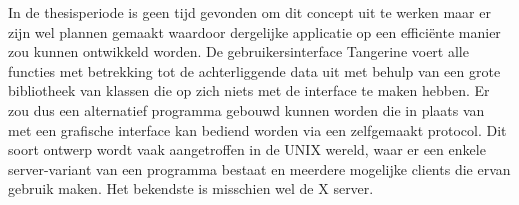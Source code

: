 In de thesisperiode is geen tijd gevonden om dit concept uit te werken maar er zijn wel plannen gemaakt waardoor dergelijke
applicatie op een effici\"ente manier zou kunnen ontwikkeld worden. De gebruikersinterface Tangerine voert alle functies met betrekking tot de achterliggende data uit met behulp van een grote bibliotheek
van klassen die op zich niets met de interface te maken hebben. Er zou dus een alternatief programma gebouwd kunnen worden die in plaats van met een grafische interface kan bediend worden
via een zelfgemaakt protocol. Dit soort ontwerp wordt vaak aangetroffen in de UNIX wereld, waar er een enkele server-variant van een programma bestaat en meerdere mogelijke clients die ervan gebruik maken.
Het bekendste is misschien wel de X server.